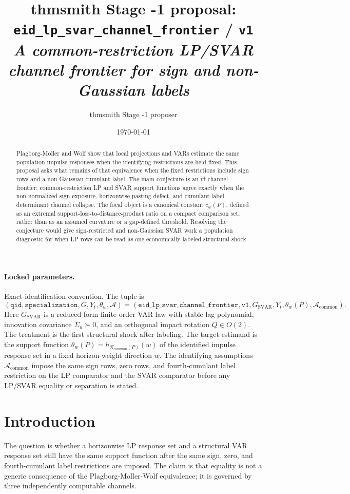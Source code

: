 \documentclass[11pt]{article}
\title{thmsmith Stage -1 proposal: \texttt{eid\_lp\_svar\_channel\_frontier} / \texttt{v1}%
  \\ \large\textit{A common-restriction LP/SVAR channel frontier for sign and non-Gaussian labels}}
\author{thmsmith Stage -1 proposer}
\date{\today}
\theoremstyle{definition}
\theoremstyle{plain}
\theoremstyle{remark}
\begin{document}
\maketitle


\paragraph{Locked parameters.}
Exact-identification convention. The tuple is
\[
(\texttt{qid},\texttt{specialization},G,Y_t,\theta_w,\mathcal A)
=
(\texttt{eid\_lp\_svar\_channel\_frontier},\texttt{v1},G_{\mathrm{SVAR}},
Y_t,\theta_w(P),\mathcal A_{\mathrm{common}}).
\]
Here \(G_{\mathrm{SVAR}}\) is a reduced-form finite-order VAR law with stable lag
polynomial, innovation covariance \(\Sigma_u\succ0\), and an orthogonal impact
rotation \(Q\in O(2)\). The treatment is the first structural shock after
labeling. The target estimand is the support function
\(\theta_w(P)=h_{\mathcal R_{\mathrm{common}}(P)}(w)\) of the identified impulse
response set in a fixed horizon-weight direction \(w\). The identifying
assumptions \(\mathcal A_{\mathrm{common}}\) impose the same sign rows, zero
rows, and fourth-cumulant label restriction on the LP comparator and the SVAR
comparator before any LP/SVAR equality or separation is stated.

\begin{abstract}
Plagborg-Moller and Wolf show that local projections and VARs estimate the same
population impulse responses when the identifying restrictions are held fixed.
This proposal asks what remains of that equivalence when the fixed restrictions
include sign rows and a non-Gaussian cumulant label. The main conjecture is an
iff channel frontier: common-restriction LP and SVAR support functions agree
exactly when the non-normalized sign exposure, horizonwise pasting defect, and
cumulant-label determinant channel collapse. The focal object is a canonical
constant \(c_w(P)\), defined as an extremal support-loss-to-distance-product
ratio on a compact comparison set, rather than as an assumed curvature or a
gap-defined threshold. Resolving the conjecture would give sign-restricted and
non-Gaussian SVAR work a population diagnostic for when LP rows can be read as
one economically labeled structural shock.
\end{abstract}

\section{Introduction}
The question is whether a horizonwise LP response set and a structural VAR
response set still have the same support function after the same sign, zero, and
fourth-cumulant label restrictions are imposed. The claim is that equality is
not a generic consequence of the Plagborg-Moller-Wolf equivalence; it is governed
by three independently computable channels.
\end{document}
